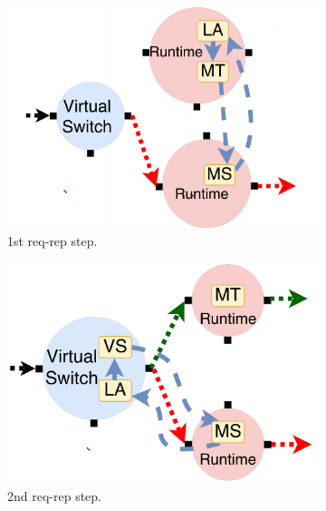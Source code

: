 \begin{figure}[!h]
\begin{subfigure}[t]{0.33\linewidth}
   \centering
   \includegraphics[width=1.1\columnwidth]{chap-nfvactor/figure/nfactor-mig1.pdf}
   \caption{1st req-rep step.}\label{fig:mig1}
  \end{subfigure}\hfill
  \begin{subfigure}[t]{0.33\linewidth}
     \centering
     \includegraphics[width=1.1\columnwidth]{chap-nfvactor/figure/nfactor-mig2.pdf}
     \caption{2nd req-rep step.}\label{fig:mig2}
    \end{subfigure}\hfill
  \begin{subfigure}[t]{0.33\linewidth}
 \centering

\end{subfigure}
\end{figure}
